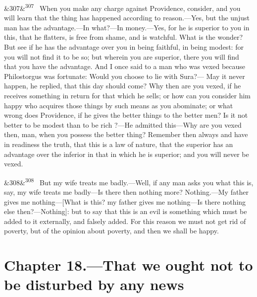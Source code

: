 \documentclass[12pt]{article}
\newcommand{\para}[1][]{\par\noindent\ifx&#1&\else\textsuperscript{\footnotesize #1}~\fi}
\begin{document}
\para[307] When you make any charge against Providence, consider, and you will learn that the thing has happened according to reason.—Yes, but the unjust man has the advantage.—In what?—In money.—Yes, for he is superior to you in this, that he flatters, is free from shame, and is watchful. What is the wonder? But see if he has the advantage over you in being faithful, in being modest: for you will not find it to be so; but wherein you are superior, there you will find that you have the advantage. And I once said to a man who was vexed because Philostorgus was fortunate: Would you choose to lie with Sura?— May it never happen, he replied, that this day should come? Why then are you vexed, if he receives something in return for that which he sells; or how can you consider him happy who acquires those things by such means as you abominate; or what wrong does Providence, if he gives the better things to the better men? Is it not better to be modest than to be rich ?—He admitted this—Why are you vexed then, man, when you possess the better thing? Remember then always and have in readiness the truth, that this is a law of nature, that the superior has an advantage over the inferior in that in which he is superior; and you will never be vexed.

\para[308] But my wife treats me badly.—Well, if any man asks you what this is, say, my wife treats me badly—Is there then nothing more? Nothing.—My father gives me nothing—[What is this? my father gives me nothing—Is there nothing else then?—Nothing]: but to say that this is an evil is something which must be added to it externally, and falsely added. For this reason we must not get rid of poverty, but of the opinion about poverty, and then we shall be happy.

\section*{Chapter 18.---That we ought not to be disturbed by any news}
\end{document}
